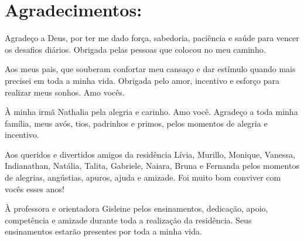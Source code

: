 \documentclass[
	12pt,				%
	oneside,			%
	a4paper,			%
	english,			%
	french,				%
	spanish,			%
	brazil,				%
	]{abntex2}
\begin{document}




\frenchspacing 


\imprimircapa

\imprimirfolhaderosto*

\tableofcontents*
\newpage

\chapter*{Agradecimentos:}

Agradeço a Deus, por ter me dado força, sabedoria, paciência e saúde para vencer os desafios diários. Obrigada pelas pessoas que colocou no meu caminho. 

Aos meus pais, que souberam confortar meu cansaço e dar estímulo quando mais precisei em toda a minha vida. Obrigada pelo amor, incentivo e esforço para realizar meus sonhos. Amo vocês. 

À minha irmã Nathalia pela alegria e carinho. Amo você. 
Agradeço a toda minha família, meus avós, tios, padrinhos e primos, pelos momentos de alegria e incentivo. 

Aos queridos e divertidos amigos da residência Lívia, Murillo, Monique, Vanessa, Indianathan, Natália, Talita, Gabriele, Naiara, Bruna e Fernanda pelos momentos de alegrias, angústias, apuros, ajuda e amizade. Foi muito bom conviver com vocês esses anos!

À professora e orientadora Gisleine pelos ensinamentos, dedicação, apoio, competência e amizade durante toda a realização da residência. Seus ensinamentos estarão presentes por toda a minha vida. 
\end{document}
